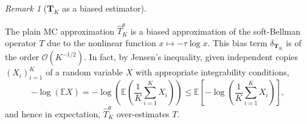 \documentclass[11pt]{article}
\numberwithin{equation}{section}
\theoremstyle{definition}
\theoremstyle{remark}
\newtheorem{remark}{Remark}[section]
\begin{document}
\begin{remark}[$ \mathbf{T}_K$ as a biased estimator]
    \label{remark:bias-plain-MC}

The plain MC approximation $\hat T^\theta_K$ is a biased approximation of  the soft-Bellman operator   $T$ due to the nonlinear function $x\mapsto -\tau  \log x$.
 This bias term $\delta_{\mathbf{T}_K}$   is of the order  $\mathcal O(K^{-1/2})$. In fact, 
 by Jensen's inequality, 
 given independent copies  $(X_i)_{i=1}^K $ 
 of a random variable   $X   $ with appropriate integrability conditions,     \begin{equation*}
        \label{eq:jensen-monte-carlo-sample-averages}
        -\log  (\mathbb E X)
        =-\log  \left(\mathbb E \left(\frac{1}{K}\sum_{i = 1}^KX_i\right)\right) 
        \leq  \mathbb E \left[-\log \left(\frac{1}{K}\sum_{i = 1}^KX_i\right)\right],
  \end{equation*}
and hence in expectation, 
 $\hat T^\theta_K$  over-estimates $T$.  
 
 
 
\end{remark}
 
\end{document}
